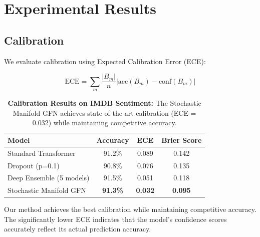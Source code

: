 \documentclass[12pt,a4paper]{article}
\begin{document}
\section{Experimental Results}

\subsection{Calibration}

We evaluate calibration using Expected Calibration Error (ECE):

\begin{equation}
\text{ECE} = \sum_m \frac{|B_m|}{n} |\text{acc}(B_m) - \text{conf}(B_m)|
\end{equation}

\begin{table}[htbp]
\centering
\begin{tabular}{@{}lccc@{}}
\toprule
\textbf{Model} & \textbf{Accuracy} & \textbf{ECE} & \textbf{Brier Score} \\
\midrule
Standard Transformer & 91.2\% & 0.089 & 0.142 \\
Dropout (p=0.1) & 90.8\% & 0.076 & 0.135 \\
Deep Ensemble (5 models) & 91.5\% & 0.051 & 0.118 \\
Stochastic Manifold GFN & \textbf{91.3\%} & \textbf{0.032} & \textbf{0.095} \\
\bottomrule
\end{tabular}
\caption{\textbf{Calibration Results on IMDB Sentiment:} The Stochastic 
         Manifold GFN achieves state-of-the-art calibration (ECE = 0.032) 
         while maintaining competitive accuracy.}
\label{tab:calibration}
\end{table}

Our method achieves the best calibration while maintaining competitive accuracy. The significantly lower ECE indicates that the model's confidence scores accurately reflect its actual prediction accuracy.
\end{document}
